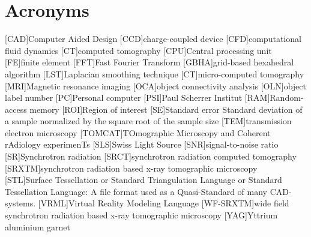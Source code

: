     \chapter*{Acronyms}
	\begin{acronym}[ACRONYM]
		[CAD]{Computer Aided Design}
		[CCD]{charge-coupled device}
		[CFD]{computational fluid dynamics}
		[CT]{computed tomography}
		[CPU]{Central processing unit}
		[FE]{finite element}
		[FFT]{Fast Fourier Transform}
		{grid-based hexahedral algorithm}
		[LST]{Laplacian smoothing technique}
		[\micro CT]{micro-computed tomography}
		[MRI]{Magnetic resonance imaging}
		[OCA]{object connectivity analysis}
		[OLN]{object label number}
		[PC]{Personal computer}
		[PSI]{Paul Scherrer Institut}
		[RAM]{Random-access memory}
		[ROI]{Region of interest}
		[SE]{Standard error} Standard deviation of a sample normalized by the square root of the sample size
		[TEM]{transmission electron microscopy}
		[TOMCAT]{TOmographic Microscopy and Coherent rAdiology experimenTs}
		[SLS]{Swiss Light Source}
		[SNR]{signal-to-noise ratio}
		[SR]{Synchrotron radiation}
		{synchrotron radiation computed tomography}
		[SRXTM]{synchrotron radiation based x-ray tomographic microscopy}
		[STL]{Surface Tessellation or Standard Triangulation Language or Standard Tessellation Language}: A file format used as a Quasi-Standard of many \acs{CAD}-systems.
		{Virtual Reality Modeling Language}
		[WF-SRXTM]{wide field synchrotron radiation based x-ray tomographic microscopy}
		[YAG]{Yttrium aluminium garnet}
	\end{acronym}
\endgroup

\cleardoublepage